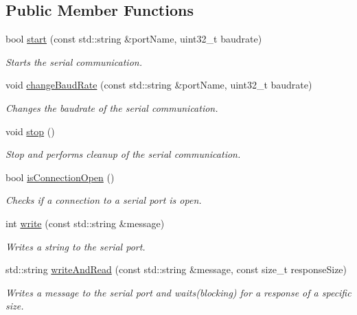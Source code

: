 \subsection*{Public Member Functions}
\begin{DoxyCompactItemize}
\item 
bool \hyperlink{class_serial_control_ab1a0d5fd054f401c2fe2b190476fb39a}{start} (const std\+::string \&port\+Name, uint32\+\_\+t baudrate)
\begin{DoxyCompactList}\small\item\em Starts the serial communication. \end{DoxyCompactList}\item 
void \hyperlink{class_serial_control_a3989d8baeb235db92234c48449e745de}{change\+Baud\+Rate} (const std\+::string \&port\+Name, uint32\+\_\+t baudrate)
\begin{DoxyCompactList}\small\item\em Changes the baudrate of the serial communication. \end{DoxyCompactList}\item 
void \hyperlink{class_serial_control_a023fb46d313a6c096641e085e86bf591}{stop} ()
\begin{DoxyCompactList}\small\item\em Stop and performs cleanup of the serial communication. \end{DoxyCompactList}\item 
bool \hyperlink{class_serial_control_a716c21c7b4abbb9361a7dc8ebd830324}{is\+Connection\+Open} ()
\begin{DoxyCompactList}\small\item\em Checks if a connection to a serial port is open. \end{DoxyCompactList}\item 
int \hyperlink{class_serial_control_a541d9b50b46fa00036921d05366ec078}{write} (const std\+::string \&message)
\begin{DoxyCompactList}\small\item\em Writes a string to the serial port. \end{DoxyCompactList}\item 
std\+::string \hyperlink{class_serial_control_a52a8a06063af9fb23d76e46d80692e32}{write\+And\+Read} (const std\+::string \&message, const size\+\_\+t response\+Size)
\begin{DoxyCompactList}\small\item\em Writes a message to the serial port and waits(blocking) for a response of a specific size. \end{DoxyCompactList}\item 

\end{DoxyCompactItemize}
